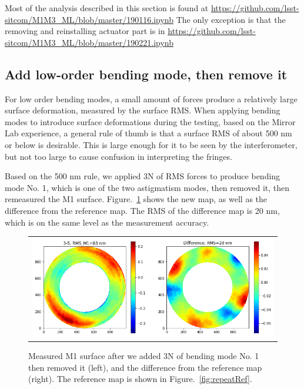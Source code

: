 \documentclass [twoside,openbib,12pt]{article}
\begin{document}
Most of the analysis described in this section is found at
\url{https://github.com/lsst-sitcom/M1M3_ML/blob/master/190116.ipynb}
The only exception is that the removing and reinstalling actuator part
is in
\url{https://github.com/lsst-sitcom/M1M3_ML/blob/master/190221.ipynb}

\subsection{Add low-order bending mode, then remove it}
\label{sec:repeatB1}

For low order bending modes, a small amount of forces produce a
relatively large surface deformation, measured by the surface
RMS. When applying bending modes to introduce surface deformations
during the testing, based on the Mirror Lab experience, a general rule of thumb is that a surface RMS of
about 500 nm or below is desirable. This is large enough for it to be seen by
the interferometer, but not too large to cause confusion in
interpreting the fringes.

Based on the 500 nm rule,
we applied 3N of RMS forces to produce bending mode No. 1, which is
one of the two astigmatism modes, then removed it, then remeasured the
M1 surface. Figure.~\ref{fig:repeatB1} shows the new map, as well as the
difference from the reference map. The RMS of the difference map is 20
nm, which is on the same level as the measurement accuracy.

 \begin{figure}[bthp]
   \begin{center}
   \begin{tabular}{c}
\includegraphics[width=120mm]{figures/repeatB1.png}
  \end{tabular}
   \end{center}
   \caption
  { \label{fig:repeatB1}
Measured M1 surface after we added 3N of bending mode No. 1 then
removed it (left), and the difference from the reference map
(right). The reference map is shown in Figure.~\ref{fig:repeatRef}.
 }
\end{figure}
\end{document}
